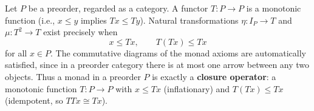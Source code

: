 Let $P$ be a preorder, regarded as a category.
A functor $T: P \to P$ is a monotonic function (i.e., $x \leq y$ implies $Tx \leq Ty$).
Natural transformations $\eta: I_P \to T$ and $\mu: T^2 \to T$ exist precisely when
$$x \leq Tx, \qquad T(Tx) \leq Tx$$
for all $x \in P$. The commutative diagrams of the monad axioms are automatically satisfied,
since in a preorder category there is at most one arrow between any two objects.
Thus a monad in a preorder $P$ is exactly a \textbf{closure operator}: a monotonic function
$T: P \to P$ with $x \leq Tx$ (inflationary) and $T(Tx) \leq Tx$ (idempotent, so $TTx \cong Tx$).
